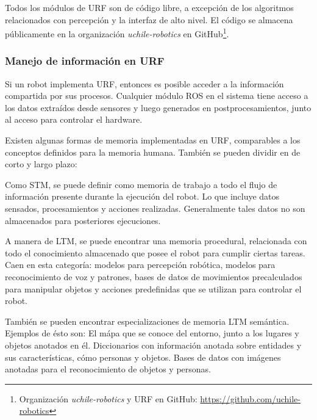 
Todos los m\'odulos de URF son de c\'odigo libre, a excepci\'on de los algoritmos relacionados con percepci\'on y la interfaz de alto nivel. El c\'odigo se almacena p\'ublicamente en la organizaci\'on \textit{uchile-robotics} en GitHub\footnote{Organizaci\'on \textit{uchile-robotics} y URF en GitHub: \url{https://github.com/uchile-robotics}}.




\subsubsection{Manejo de informaci\'on en URF}

Si un robot implementa URF, entonces es posible acceder a la informaci\'on compartida por sus procesos. Cualquier m\'odulo ROS en el sistema tiene acceso a los datos extra\'idos desde sensores y luego generados en postprocesamientos, junto al acceso para controlar el hardware.

Existen algunas formas de memoria implementadas en URF, comparables a los conceptos definidos para la memoria humana. Tambi\'en se pueden dividir en de corto y largo plazo:

Como STM, se puede definir como memoria de trabajo a todo el flujo de informaci\'on presente durante la ejecuci\'on del robot. Lo que incluye datos sensados, procesamientos y acciones realizadas. Generalmente tales datos no son almacenados para posteriores ejecuciones.

A manera de LTM, se puede encontrar una memoria procedural, relacionada con todo el conocimiento almacenado que posee el robot para cumplir ciertas tareas. Caen en esta categor\'ia: modelos para percepci\'on rob\'otica, modelos para reconocimiento de voz y patrones, bases de datos de movimientos precalculados para manipular objetos y acciones predefinidas que se utilizan para controlar el robot.

Tambi\'en se pueden encontrar especializaciones de memoria LTM sem\'antica. Ejemplos de \'esto son: El m\'apa que se conoce del entorno, junto a los lugares y objetos anotados en \'el. Diccionarios con informaci\'on anotada sobre entidades y sus caracter\'isticas, c\'omo personas y objetos. Bases de datos con im\'agenes anotadas para el reconocimiento de objetos y personas. 

